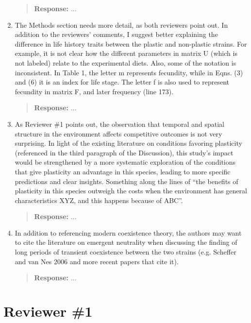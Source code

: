 \documentclass[letterpaper,11pt]{article}
\begin{document}
\begin{enumerate}[label=E.\arabic*, ref=(E.\arabic*)]
\begin{quote}
\textbf{Response:} ...
\end{quote}

\item The Methods section needs more detail, as both reviewers point out. In addition to the reviewers’ comments, I suggest better explaining the difference in life history traits between the plastic and non-plastic strains. For example, it is not clear how the different parameters in matrix U (which is not labeled) relate to the experimental diets. Also, some of the notation is inconsistent. In Table 1, the letter m represents fecundity, while in Eqns. (3) and (6) it is an index for life stage. The letter f is also used to represent fecundity in matrix F, and later frequency (line 173).

\begin{quote}
  \textbf{Response:} ...
  \end{quote}

\item As Reviewer \#1 points out, the observation that temporal and spatial structure in the environment affects competitive outcomes is not very surprising. In light of the existing literature on conditions favoring plasticity (referenced in the third paragraph of the Discussion), this study’s impact would be strengthened by a more systematic exploration of the conditions that give plasticity an advantage in this species, leading to more specific predictions and clear insights. Something along the lines of ``the benefits of plasticity in this species outweigh the costs when the environment has general characteristics XYZ, and this happens because of ABC''.

\begin{quote}
  \textbf{Response:} ...
  \end{quote}

\item In addition to referencing modern coexistence theory, the authors may want to cite the literature on emergent neutrality when discussing the finding of long periods of transient coexistence between the two strains (e.g. Scheffer and van Nes 2006 and more recent papers that cite it).

\begin{quote}
  \textbf{Response:} ...
  \end{quote}

\end{enumerate}

\section*{Reviewer \#1} 
\end{document}
